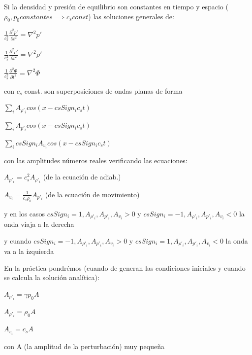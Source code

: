 \documentclass{article}
\begin{document}
\begin{description}  
\item Si la densidad y presión de equilibrio son constantes en tiempo y espacio ($\rho_0, p_0 constantes \implies c_s const$) las soluciones generales de:
\item $\frac{1}{c_s^{2}} \frac{\partial^{2} p\prime}{\partial t^{2}} = \nabla^{2} p\prime    $
\item $\frac{1}{c_s^{2}} \frac{\partial^{2} \rho\prime}{\partial t^{2}} = \nabla^{2} \rho\prime    $
\item $\frac{1}{c_s^{2}} \frac{\partial^{2} \Phi}{\partial t^{2}} = \nabla^{2} \Phi    $
\item  con $c_s$ const. son superposiciones de ondas planas de forma
\item $ \sum_{i} A_{\rho\prime_i} cos (x - csSign_i c_s t) $
\item $ \sum_{i} A_{p\prime_i} cos (x - csSign_i c_s t) $
\item $ \sum_{i} csSign_i A_{v_i} cos (x - csSign_i c_s t) $ 
\item con las amplitudes números reales verificando las ecuaciones:


\item $A_{p\prime_i} = c_s^{2} A_{\rho\prime_i}$ (de la ecuación de adiab.)
\item $A_{v_i} = \frac{1}{c_s \rho_0} A_{p\prime_i}$  (de la ecuación de movimiento)
\item y en los  casos $csSign_i = 1, A_{\rho\prime_i}, A_{p\prime_i}, A_{v_i} > 0$ y 
$csSign_i = -1, A_{\rho\prime_i}, A_{p\prime_i}, A_{v_i} < 0$  la onda viaja a la derecha
\item y cuando $csSign_i = -1, A_{\rho\prime_i}, A_{p\prime_i}, A_{v_i} > 0$ y 
$csSign_i = 1, A_{\rho\prime_i}, A_{p\prime_i}, A_{v_i} < 0$  la onda va a la izquierda

\item En la práctica pondrémos (cuando de generan las condiciones iniciales y cuando se calcula la solución analítica):
\item $A_{p\prime_i} = \gamma   p_0  A$
\item $A_{\rho\prime_i} = \rho_0  A$
\item $A_{v_i} = c_s  A$
\item con A (la amplitud de la perturbación) muy pequeña 

\end{description}  
\end{document}
